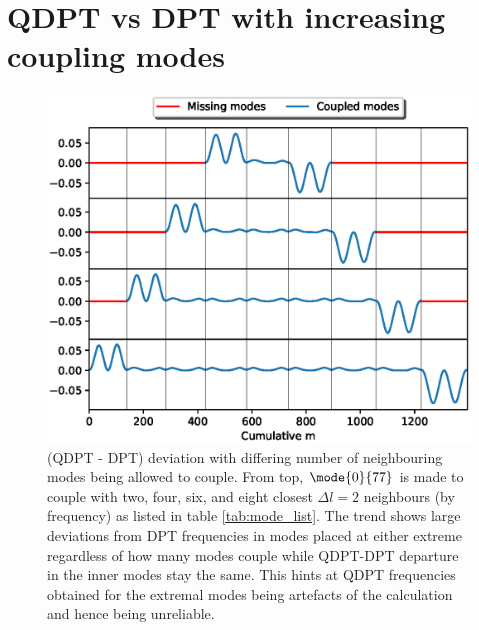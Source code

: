 \chapter{QDPT vs DPT with increasing coupling modes}

\begin{figure}[h!]
\includegraphics[scale=0.9, center]{Chapter4/figs/qdpt_err}
\caption{(QDPT - DPT) deviation with differing number of neighbouring modes being allowed to couple. From top, $\mode{0}{77}$ is made to couple with two, four, six, and eight closest $\Delta l=2$ neighbours (by frequency) as listed in table \ref{tab:mode_list}. The trend shows large deviations from DPT frequencies in modes placed at either extreme regardless of how many modes couple while QDPT-DPT departure in the inner modes stay the same. This hints at QDPT frequencies obtained for the extremal modes being artefacts of the calculation and hence being unreliable.}
\label{fig:DPT_err} 
\end{figure}